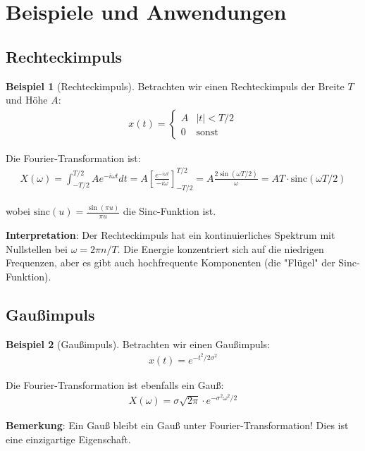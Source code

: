 ﻿\documentclass[a4paper,12pt]{report}
\theoremstyle{definition}
\newtheorem{beispiel}{Beispiel}
\begin{document}
	\section{Beispiele und Anwendungen}
	
	\subsection{Rechteckimpuls}
	
	\begin{beispiel}[Rechteckimpuls]
		Betrachten wir einen Rechteckimpuls der Breite $T$ und Höhe $A$:
		\begin{align}
			x(t) = \begin{cases} A & |t| < T/2 \\ 0 & \text{sonst} \end{cases}
		\end{align}
		
		Die Fourier-Transformation ist:
		\begin{align}
			X(\omega) = \int_{-T/2}^{T/2} A e^{-i\omega t} dt = A \left[\frac{e^{-i\omega t}}{-i\omega}\right]_{-T/2}^{T/2} = A \frac{2\sin(\omega T/2)}{\omega} = AT \cdot \text{sinc}(\omega T/2)
		\end{align}
		
		wobei $\text{sinc}(u) = \frac{\sin(\pi u)}{\pi u}$ die Sinc-Funktion ist.
		
		\textbf{Interpretation}: Der Rechteckimpuls hat ein kontinuierliches Spektrum mit Nullstellen bei $\omega = 2\pi n / T$. Die Energie konzentriert sich auf die niedrigen Frequenzen, aber es gibt auch hochfrequente Komponenten (die "Flügel" der Sinc-Funktion).
	\end{beispiel}
	
	\subsection{Gaußimpuls}
	
	\begin{beispiel}[Gaußimpuls]
		Betrachten wir einen Gaußimpuls:
		\begin{align}
			x(t) = e^{-t^2/2\sigma^2}
		\end{align}
		
		Die Fourier-Transformation ist ebenfalls ein Gauß:
		\begin{align}
			X(\omega) = \sigma\sqrt{2\pi} \cdot e^{-\sigma^2\omega^2/2}
		\end{align}
		
		\textbf{Bemerkung}: Ein Gauß bleibt ein Gauß unter Fourier-Transformation! Dies ist eine einzigartige Eigenschaft.
	\end{beispiel}
	
\end{document}
